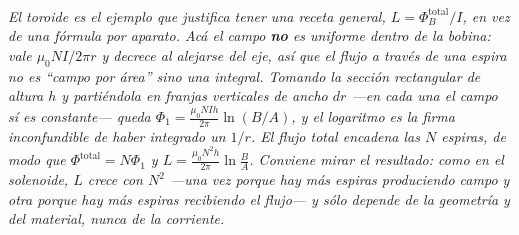 \begin{center}
\\[0.5em]
{\small\itshape El toroide es el ejemplo que justifica tener una receta general,
$L = \Phi_B^{\text{total}}/I$, en vez de una fórmula por aparato. Acá el campo
\textbf{no} es uniforme dentro de la bobina: vale $\mu_0 N I/2\pi r$ y decrece
al alejarse del eje, así que el flujo a través de una espira no es ``campo por
área'' sino una integral. Tomando la sección rectangular de altura $h$ y
partiéndola en franjas verticales de ancho $dr$ ---en cada una el campo sí es
constante--- queda $\Phi_1 = \frac{\mu_0 N I h}{2\pi}\ln(B/A)$, y el logaritmo
es la firma inconfundible de haber integrado un $1/r$. El flujo total encadena
las $N$ espiras, de modo que $\Phi^{\text{total}} = N\Phi_1$ y
$L = \frac{\mu_0 N^2 h}{2\pi}\ln\frac{B}{A}$. Conviene mirar el resultado: como
en el solenoide, $L$ crece con $N^2$ ---una vez porque hay más espiras
produciendo campo y otra porque hay más espiras recibiendo el flujo--- y sólo
depende de la geometría y del material, nunca de la corriente.}
\end{center}
